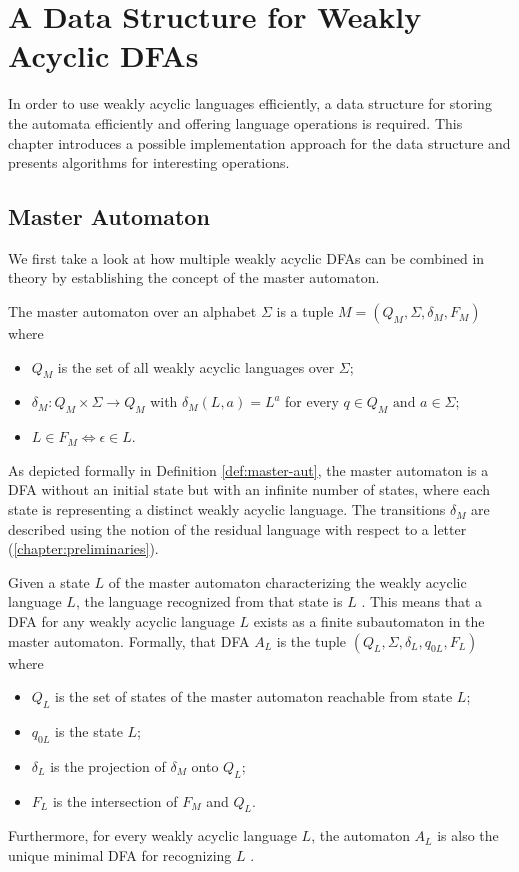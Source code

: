 \chapter{A Data Structure for Weakly Acyclic DFAs}\label{chapter:datastructure}
In order to use weakly acyclic languages efficiently, a data structure for storing the automata efficiently and offering language operations is required. This chapter introduces a possible implementation approach for the data structure and presents algorithms for interesting operations.

\section{Master Automaton}\label{sec:master-aut}
We first take a look at how multiple weakly acyclic DFAs can be combined in theory by establishing the concept of the master automaton. 
\begin{definition}\label{def:master-aut}
The master automaton over an alphabet $\Sigma$ is a tuple $M = (Q_{M},\Sigma,\delta_{M},F_{M})$ where 
\begin{itemize}[--,noitemsep]
\item $Q_{M}$ is the set of all weakly acyclic languages over $\Sigma$;
\item $\delta_{M}: Q_{M} \times \Sigma \rightarrow Q_{M}$  with $\delta_{M}(L,a) = L^{a}$ for every $q \in Q_{M} \text{ and } a \in \Sigma$;
\item $L \in F_{M} \iff \epsilon \in L$.
\end{itemize}
\end{definition}
As depicted formally in Definition \autoref{def:master-aut}, the master automaton is a DFA without an initial state but with an infinite number of states, where each state is representing a distinct weakly acyclic language. The transitions $\delta_{M}$ are described using the notion of the residual language with respect to a letter (\autoref{chapter:preliminaries}).

\par

Given a state $L$ of the master automaton characterizing the weakly acyclic language $L$, the language recognized from that state is $L$ \cite[Proposition~8]{blondin_24}. This means that a DFA for any weakly acyclic language $L$ exists as a finite subautomaton in the master automaton. Formally, that DFA $A_{L}$ is the tuple $(Q_{L},\Sigma,\delta_{L},q_{0L},F_{L})$ where 
\begin{itemize}[--,noitemsep]
\item $Q_{L}$ is the set of states of the master automaton reachable from state $L$;
\item $q_{0L}$ is the state $L$;
\item $\delta_{L}$ is the projection of $\delta_{M}$ onto $Q_{L}$;
\item $F_{L}$ is the intersection of $F_{M}$ and $Q_{L}$.
\end{itemize}
Furthermore, for every weakly acyclic language $L$, the automaton $A_{L}$ is also the unique minimal DFA for recognizing $L$ \cite[Proposition~9]{blondin_24}. 

